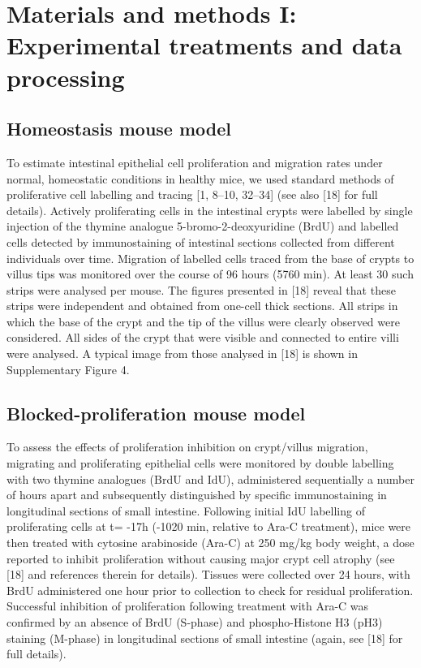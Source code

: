 \documentclass[10pt,letterpaper]{article}
\begin{document}
\section{Materials and methods I: Experimental treatments and data
processing}\label{materials-and-methods-i-experimental-treatments-and-data-processing}

\subsection{Homeostasis mouse model}\label{homeostasis-mouse-model}

To estimate intestinal epithelial cell proliferation and migration rates
under normal, homeostatic conditions in healthy mice, we used standard
methods of proliferative cell labelling and tracing {[}1, 8--10,
32--34{]} (see also {[}18{]} for full details). Actively proliferating
cells in the intestinal crypts were labelled by single injection of the
thymine analogue 5-bromo-2-deoxyuridine (BrdU) and labelled cells
detected by immunostaining of intestinal sections collected from
different individuals over time. Migration of labelled cells traced from
the base of crypts to villus tips was monitored over the course of 96
hours (5760 min). At least 30 such strips were analysed per mouse. The
figures presented in {[}18{]} reveal that these strips were independent
and obtained from one-cell thick sections. All strips in which the base
of the crypt and the tip of the villus were clearly observed were
considered. All sides of the crypt that were visible and connected to
entire villi were analysed. A typical image from those analysed in
{[}18{]} is shown in Supplementary Figure 4.

\subsection{Blocked-proliferation mouse
model}\label{blocked-proliferation-mouse-model}

To assess the effects of proliferation inhibition on crypt/villus
migration, migrating and proliferating epithelial cells were monitored
by double labelling with two thymine analogues (BrdU and IdU),
administered sequentially a number of hours apart and subsequently
distinguished by specific immunostaining in longitudinal sections of
small intestine. Following initial IdU labelling of proliferating cells
at t= -17h (-1020 min, relative to Ara-C treatment), mice were then
treated with cytosine arabinoside (Ara-C) at 250 mg/kg body weight, a
dose reported to inhibit proliferation without causing major crypt cell
atrophy (see {[}18{]} and references therein for details). Tissues were
collected over 24 hours, with BrdU administered one hour prior to
collection to check for residual proliferation. Successful inhibition of
proliferation following treatment with Ara-C was confirmed by an absence
of BrdU (S-phase) and phospho-Histone H3 (pH3) staining (M-phase) in
longitudinal sections of small intestine (again, see {[}18{]} for full
details).
\end{document}
